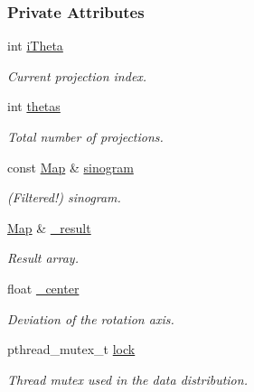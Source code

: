\subsubsection*{Private Attributes}
\begin{DoxyCompactItemize}
\item 
int \hyperlink{classline__distributor_ae28a2177cfe9ee1543be5acd2cd71021}{iTheta}
\begin{DoxyCompactList}\small\item\em Current projection index. \item\end{DoxyCompactList}\item 
int \hyperlink{classline__distributor_ad2f703043945e7e06b5436e083fdd7b7}{thetas}
\begin{DoxyCompactList}\small\item\em Total number of projections. \item\end{DoxyCompactList}\item 
const \hyperlink{group__Types_ga8747378c016fc11d9ecbb98787248c25}{Map} \& \hyperlink{classline__distributor_a0555ca96a9a71a22d2461b3696f9b790}{sinogram}
\begin{DoxyCompactList}\small\item\em (Filtered!) sinogram. \item\end{DoxyCompactList}\item 
\hyperlink{group__Types_ga8747378c016fc11d9ecbb98787248c25}{Map} \& \hyperlink{classline__distributor_acc0782b9128204f48b6dc413a28eb935}{\_\-result}
\begin{DoxyCompactList}\small\item\em Result array. \item\end{DoxyCompactList}\item 
float \hyperlink{classline__distributor_a4c7d258ed09b1fb6838944176d3fde22}{\_\-center}
\begin{DoxyCompactList}\small\item\em Deviation of the rotation axis. \item\end{DoxyCompactList}\item 
pthread\_\-mutex\_\-t \hyperlink{classline__distributor_af8b21b97322b11c4c1c26d476a5dc5f3}{lock}
\begin{DoxyCompactList}\small\item\em Thread mutex used in the data distribution. \item\end{DoxyCompactList}\end{DoxyCompactItemize}



